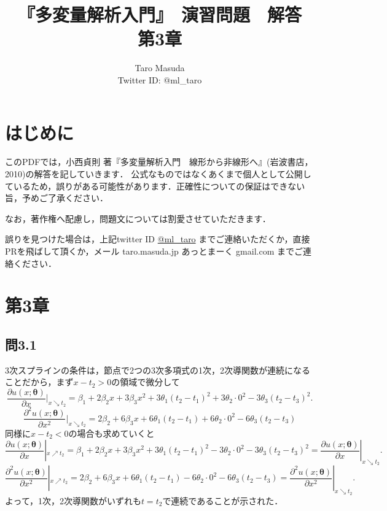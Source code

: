 \documentclass[pdflatex,ja=standard]{bxjsarticle}
\title{『多変量解析入門』　演習問題　解答　第3章}
\author{Taro Masuda \\ Twitter ID: @ml\_taro}
\begin{document}
\maketitle

\section*{はじめに}
このPDFでは，小西貞則 著『多変量解析入門　線形から非線形へ』(岩波書店，2010)の解答を記していきます．
公式なものではなくあくまで個人として公開しているため，誤りがある可能性があります．正確性についての保証はできない旨，予めご了承ください．

なお，著作権へ配慮し，問題文については割愛させていただきます．

誤りを見つけた場合は，上記twitter ID \href{https://twitter.com/ml_taro}{@ml\_taro} までご連絡いただくか，直接PRを飛ばして頂くか，メール taro.masuda.jp あっとまーく gmail.com までご連絡ください．

\section*{第3章}

\subsection*{問3.1}
3次スプラインの条件は，節点で2つの3次多項式の1次，2次導関数が連続になることだから，まず$x - t_2 > 0$の領域で微分して
\begin{equation}
\frac{\partial u(x; \bm{\theta})}{\partial x} |_{x \searrow t_2} = \beta_1 + 2 \beta_2 x + 3 \beta_3 x^2 + 3 \theta_1 (t_2 - t_1)^2 + 3 \theta_2 \cdot 0^2 - 3 \theta_3 (t_2 - t_3)^2.
\end{equation}
\begin{equation}
\frac{\partial^2 u(x; \bm{\theta})}{\partial x^2} |_{x \searrow t_2} = 2\beta_2 + 6 \beta_3 x + 6 \theta_1 (t_2 - t_1) + 6 \theta_2 \cdot 0^2 - 6 \theta_3 (t_2 - t_3)
\end{equation}
同様に$x - t_2 < 0$の場合も求めていくと
\begin{equation}
\frac{\partial u(x; \bm{\theta})}{\partial x} |_{x \nearrow t_2} = \beta_1 + 2 \beta_2 x + 3 \beta_3 x^2 + 3 \theta_1 (t_2 - t_1)^2 - 3 \theta_2 \cdot 0^2 - 3 \theta_3 (t_2 - t_3)^2 = \frac{\partial u(x; \bm{\theta})}{\partial x} |_{x \searrow t_2}.
\end{equation}
\begin{equation}
\frac{\partial^2 u(x; \bm{\theta})}{\partial x^2} |_{x \nearrow t_2} = 2\beta_2 + 6 \beta_3 x + 6 \theta_1 (t_2 - t_1) - 6 \theta_2 \cdot 0^2 - 6 \theta_3 (t_2 - t_3) = \frac{\partial^2 u(x; \bm{\theta})}{\partial x^2} |_{x \searrow t_2} .
\end{equation}
よって，1次，2次導関数がいずれも$t=t_2$で連続であることが示された．
\end{document}
